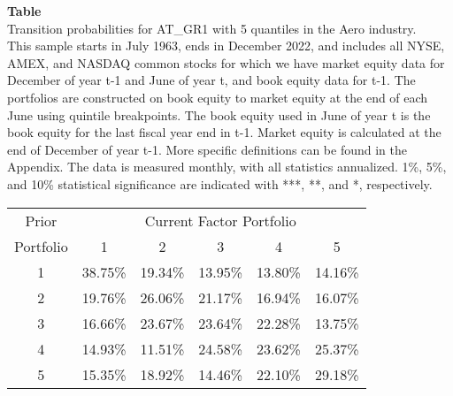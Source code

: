 \begin{table*}[ht!]
\raggedright
{}
\label{tab: transition_probs_AT_GR1_Aero_with_5_quantiles}
\textbf{Table \thetable} \\
Transition probabilities for AT_GR1 with 5 quantiles in the Aero industry. \\
\hspace*{1em}This sample starts in July 1963, ends in December 2022, and includes all NYSE, AMEX, and NASDAQ common stocks for which we have market equity data for December of year t-1 and June of year t, and book equity data for t-1. The portfolios are constructed on book equity to market equity at the end of each June using quintile breakpoints.  The book equity used in June of year t is the book equity for the last fiscal year end in t-1.  Market equity is calculated at the end of December of year t-1.  More specific definitions can be found in the Appendix.  The data is measured monthly, with all statistics annualized.  1\%, 5\%, and 10\% statistical significance are indicated with ***, **, and *, respectively. \\
\vspace{0.5em}
\centering
\begin{adjustbox}{max width=\textwidth}
\begin{tabular}{@{}cccccc@{}}
\toprule
Prior & \multicolumn{5}{c}{Current Factor Portfolio} \\
Portfolio & 1 & 2 & 3 & 4 & 5 \\
\midrule
1 & 38.75\% & 19.34\% & 13.95\% & 13.80\% & 14.16\% \\
2 & 19.76\% & 26.06\% & 21.17\% & 16.94\% & 16.07\% \\
3 & 16.66\% & 23.67\% & 23.64\% & 22.28\% & 13.75\% \\
4 & 14.93\% & 11.51\% & 24.58\% & 23.62\% & 25.37\% \\
5 & 15.35\% & 18.92\% & 14.46\% & 22.10\% & 29.18\% \\
\bottomrule
\end{tabular}
\end{adjustbox}
\end{table*}